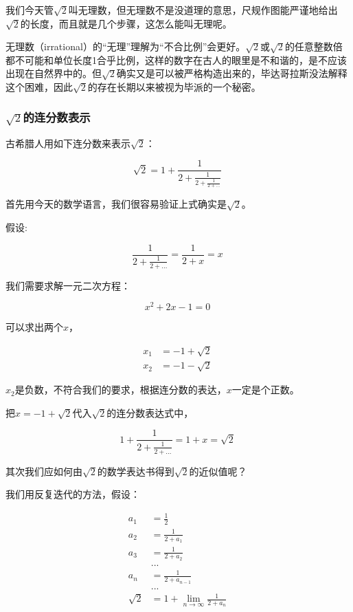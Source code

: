 我们今天管$\sqrt{2}$叫无理数，但无理数不是没道理的意思，尺规作图能严谨地给出$\sqrt{2}$的长度，而且就是几个步骤，这怎么能叫无理呢。

无理数（irrational）的“无理”理解为“不合比例”会更好。$\sqrt{2}$或$\sqrt{2}$的任意整数倍都不可能和单位长度1合乎比例，这样的数字在古人的眼里是不和谐的，是不应该出现在自然界中的。但$\sqrt{2}$确实又是可以被严格构造出来的，毕达哥拉斯没法解释这个困难，因此$\sqrt{2}$的存在长期以来被视为毕派的一个秘密。

\subsubsection{$\sqrt{2}$的连分数表示}

古希腊人用如下连分数来表示$\sqrt{2}$：

\begin{equation}
\sqrt{2} = 1 + \frac{1}{ 2 + \frac{1}{ 2 + \frac{1}{2+ ...} }}~
\end{equation}

首先用今天的数学语言，我们很容易验证上式确实是$\sqrt{2}$。

假设:

\begin{equation}
\frac{1}{2 + \frac{1}{2+ ...}} = \frac{1}{2 + x} = x~
\end{equation}

我们需要求解一元二次方程：

\begin{equation}
x^2 + 2 x -1 =0~
\end{equation}

可以求出两个$x$，

\begin{align}
x_1 & =  -1 + \sqrt{2} \\
x_2 & =  -1 - \sqrt{2}~
\end{align}

$x_2$是负数，不符合我们的要求，根据连分数的表达，$x$一定是个正数。

把$x= -1 + \sqrt{2}$代入$\sqrt{2}$的连分数表达式中，

\begin{equation}
1 + \frac{1}{2+ \frac{1}{2+...}} = 1 + x = \sqrt{2}~
\end{equation}

其次我们应如何由$\sqrt{2}$的数学表达书得到$\sqrt{2}$的近似值呢？

我们用反复迭代的方法，假设：

\begin{align}
a_1 &= \frac{1}{2} \\
a_2 &= \frac{1}{2 + a_1} \\
a_3 & =  \frac{1}{2 + a_2} \\
{} & {...}  {} \\
a_n & =  \frac{1}{2+a_{n-1}}\\
{}  & {...}   {} \\
\sqrt{2} & =  1 + \lim\limits_{n \to \infty} \frac{1}{2+a_n}~
\end{align}

